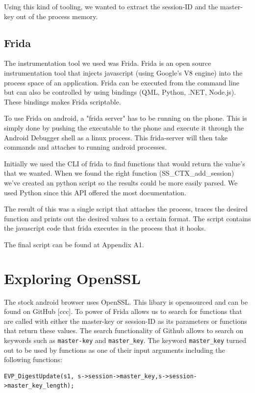 \documentclass[12pt, a4paper]{report}
\begin{document}
Using this kind of tooling, we wanted to extract the session-ID and the master-key out of the process memory. 

\subsection{Frida}

The instrumentation tool we used was Frida. Frida is an open source instrumentation tool that injects javascript (using Google's V8 engine) into the process space of an application. Frida can be executed from the command line but can also be controlled by using bindings (QML, Python, .NET, Node.js). These bindings makes Frida scriptable. 

To use Frida on android, a "frida server" has to be running on the phone. This is simply done by pushing the executable to the phone and execute it through the Android Debugger shell as a linux process. This frida-server will then take commands and attaches to running android processes.

Initially we used the CLI of frida to find functions that would return the value's that we wanted. When we found the right function (SS\_CTX\_add\_session) we’ve created an python script so the results could be more easily parsed. We used Python since this API offered the most documentation. 

The result of this was a single script that attaches the process, traces the desired function and prints out the desired values to a certain format. The script contains the javascript code that frida executes in the process that it hooks.

The final script can be found at Appendix A1.
\clearpage

\section{Exploring OpenSSL}
The stock android browser uses OpenSSL. This libary is opensourced and can be found on GitHub [ccc]. To power of Frida allows us to search for functions that are called with either the master-key or session-ID as its parameters or functions that return these values. The search functionality of Github allows to search on keywords such as \texttt{master-key} and \texttt{master\_key}. The keyword \texttt{master\_key} turned out to be used by functions as one of their input arguments including the following functions:

\begin{lstlisting}[frame=single, breaklines=true]
EVP_DigestUpdate(s1, s->session->master_key,s->session->master_key_length);
\end{lstlisting}
\end{document}
